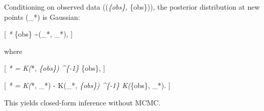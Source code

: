 \documentclass[
  letterpaper,
  DIV=11,
  numbers=noendperiod]{scrartcl}
\begin{document}
Conditioning on observed data ((\emph{\{obs\},
}\{obs\})), the posterior distribution at new points
(\_*) is Gaussian:

{[} \emph{* \mid {}}\{obs\} \sim  {}(\mu\_*,
\Sigma\_*), {]}

where

{[} \mu\emph{* = K(}*, \emph{\{obs\})
\^{}\{-1\}
}\{obs\}, {]}

{[} \Sigma\emph{* = K(}*, \_*) - K(\_*,
\emph{\{obs\})
\^{}\{-1\}
K(}\{obs\}, \_*). {]}

This yields closed-form inference without MCMC.
\end{document}
